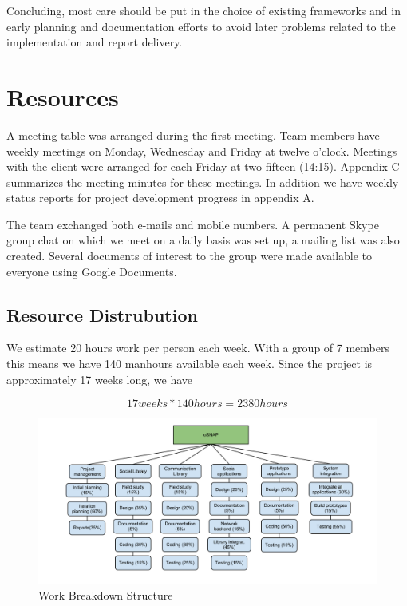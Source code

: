 Concluding, most care should be put in the choice of existing frameworks and in early planning
and documentation efforts to avoid later problems related to the implementation and report delivery.


\section{Resources}
A meeting table was arranged during the first meeting. Team members
have weekly meetings on Monday, Wednesday and Friday at twelve o'clock.
Meetings with the client were arranged for each Friday at two fifteen (14:15).
Appendix C summarizes the meeting minutes for these meetings. In addition we
have weekly status reports for project development progress in appendix A.

The team exchanged both e-mails and mobile numbers. A permanent Skype
group chat on which we meet on a daily basis was set up, a mailing
list was also created. Several documents of interest to the group
were made available to everyone using Google Documents.

\subsection{Resource Distrubution}
We estimate 20 hours work per person each week. With a group of 7 members this means we have
140 manhours available each week. Since the project is approximately 17 weeks long, we have

\begin{equation}
17 weeks * 140 hours = 2380 hours
\end{equation}


\begin{figure}[h!]
\centering \includegraphics[width=1.1\textwidth]{img/mgmt-wbs.png} \caption{Work Breakdown Structure}
\label{fig:mgmt-wbs}
\end{figure}


